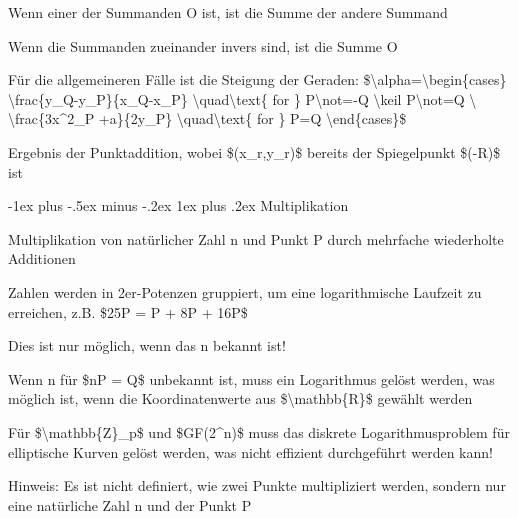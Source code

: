 \documentclass[a4paper]{article}
\makeatletter
\renewcommand{\subsubsection}{\@startsection{subsubsection}{3}{0mm}%
 {-1ex plus -.5ex minus -.2ex}%
 {1ex plus .2ex}%
 {\normalfont\small\bfseries}}
\makeatother
\begin{document}
\begin{multicols}{3}
      \begin{itemize*}
            \item Wenn einer der Summanden O ist, ist die Summe der andere Summand
            \item Wenn die Summanden zueinander invers sind, ist die Summe O
            \item Für die allgemeineren Fälle ist die Steigung der Geraden:
            \$\textbackslash alpha=\textbackslash begin\{cases\}
            \textbackslash frac\{y\_Q-y\_P\}\{x\_Q-x\_P\}
            \textbackslash quad\textbackslash text\{ for \} P\textbackslash not=-Q
            \textbackslash keil P\textbackslash not=Q \textbackslash{}
            \textbackslash frac\{3x\^{}2\_P +a\}\{2y\_P\}
            \textbackslash quad\textbackslash text\{ for \} P=Q
            \textbackslash end\{cases\}\$
            \item Ergebnis der Punktaddition, wobei \$(x\_r,y\_r)\$ bereits der
            Spiegelpunkt \$(-R)\$ ist
      \end{itemize*}


      \subsubsection{Multiplikation}

      \begin{itemize*}
            \item Multiplikation von natürlicher Zahl n und Punkt P durch mehrfache
            wiederholte Additionen
            \item Zahlen werden in 2er-Potenzen gruppiert, um eine logarithmische
            Laufzeit zu erreichen, z.B. \$25P = P + 8P + 16P\$
            \item Dies ist nur möglich, wenn das n bekannt ist!
            \item Wenn n für \$nP = Q\$ unbekannt ist, muss ein Logarithmus gelöst
            werden, was möglich ist, wenn die Koordinatenwerte aus
            \$\textbackslash mathbb\{R\}\$ gewählt werden
            \item Für \$\textbackslash mathbb\{Z\}\_p\$ und \$GF(2\^{}n)\$ muss das
            diskrete Logarithmusproblem für elliptische Kurven gelöst werden, was
            nicht effizient durchgeführt werden kann!
            \item Hinweis: Es ist nicht definiert, wie zwei Punkte multipliziert werden,
            sondern nur eine natürliche Zahl n und der Punkt P
      \end{itemize*}



\end{multicols}
\end{document}
